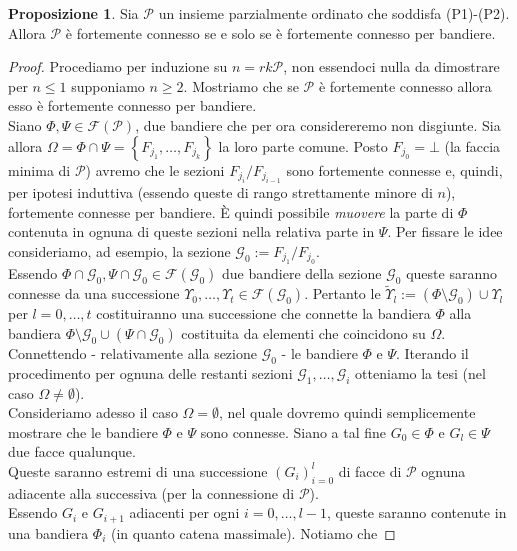 \documentclass[a4paper,12pt]{report}
\newcommand{\p}{\mathcal{P}}
\theoremstyle{plain}
\theoremstyle{definition}
\newtheorem{prop}[teo]{Proposizione}
\begin{document}
\begin{prop}
\label{prop:P3Flags}
Sia $\p$ un insieme parzialmente ordinato che soddisfa (P1)-(P2). Allora $\p$ \`e fortemente connesso se e solo se \`e fortemente
connesso per bandiere.
\end{prop}
\begin{proof}
Procediamo per induzione su $n=rk\p$, non essendoci nulla da dimostrare per $n\leq 1$ supponiamo $n\geq 2$. Mostriamo che se $\p$ \`e
fortemente connesso allora esso \`e fortemente connesso per bandiere.\\
Siano $\Phi,\Psi\in\mathcal{F}(\p)$, due bandiere che per ora considereremo non disgiunte. Sia allora $\Omega=\Phi\cap\Psi=\left\{F_{j_1},\dots,F_{j_k}\right\}$ 
la loro parte comune. Posto $F_{j_0}=\bot$ (la faccia minima di $\p$) avremo che le sezioni $F_{j_i}/F_{j_{i-1}}$ sono fortemente connesse e, quindi,
per ipotesi induttiva (essendo queste di rango strettamente minore di $n$), fortemente connesse per bandiere. \`E quindi possibile \emph{muovere} la parte di
$\Phi$ contenuta in ognuna di queste sezioni nella relativa parte in $\Psi$. Per fissare le idee consideriamo, ad esempio, la sezione
$\mathcal{G}_0:=F_{j_1}/F_{j_0}$.\\
Essendo $\Phi\cap\mathcal{G}_0,\Psi\cap\mathcal{G}_0\in\mathcal{F}(\mathcal{G}_0)$ due bandiere della sezione $\mathcal{G}_0$ queste saranno connesse da una 
successione $\Upsilon_0,\dots,\Upsilon_t\in\mathcal{F}(\mathcal{G}_0)$. Pertanto le $\widetilde{\Upsilon}_l:=(\Phi\setminus\mathcal{G}_0)\cup\Upsilon_l$ per
$l=0,\dots,t$ costituiranno una successione che connette la bandiera $\Phi$ alla bandiera $\Phi\setminus\mathcal{G}_0\cup(\Psi\cap\mathcal{G}_0)$
costituita da elementi che coincidono su $\Omega$.
Connettendo - relativamente alla sezione $\mathcal{G}_0$ - le bandiere $\Phi$ e $\Psi$. Iterando il procedimento per ognuna delle restanti sezioni
$\mathcal{G}_1,\dots,\mathcal{G}_i$ otteniamo la tesi (nel caso $\Omega\ne\emptyset$).\\
Consideriamo adesso il caso $\Omega=\emptyset$, nel quale dovremo quindi semplicemente mostrare che le bandiere $\Phi$ e $\Psi$ sono connesse.
Siano a tal fine $G_0\in\Phi$ e $G_l\in\Psi$ due facce qualunque.\\
Queste saranno estremi di una successione $(G_i)_{i=0}^l$ di facce di $\p$
ognuna adiacente alla successiva (per la connessione di $\p$).\\
Essendo $G_i$ e $G_{i+1}$ adiacenti per ogni $i=0,\dots,l-1$, queste saranno contenute in una bandiera $\Phi_i$ (in quanto catena massimale). Notiamo che

\end{proof}
\end{document}
